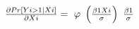$\frac{{\partial Pr[Yi > 1|Xi]}}{{\partial Xi}} = {\rm{\ }}\varphi {\rm{\ }}\left( {\frac{{\beta 1Xi}}{\sigma }} \right){\rm{\ }}\frac{{\beta 1}}{\sigma }$
